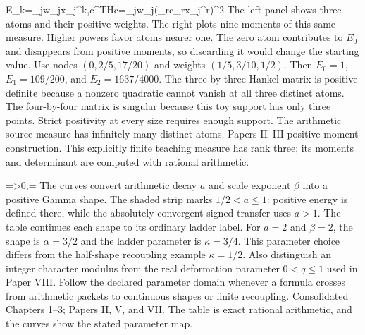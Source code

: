 {E_k=\sum_jw_jx_j^k,\qquad c^THc=\sum_jw_j\left(\sum_rc_rx_j^r\right)^2}
{The left panel shows three atoms and their positive weights. The right plots nine moments of this same measure. Higher powers favor atoms nearer one. The zero atom contributes to $E_0$ and disappears from positive moments, so discarding it would change the starting value.}
{Use nodes $(0,2/5,17/20)$ and weights $(1/5,3/10,1/2)$. Then $E_0=1$, $E_1=109/200$, and $E_2=1637/4000$. The three-by-three Hankel matrix is positive definite because a nonzero quadratic cannot vanish at all three distinct atoms. The four-by-four matrix is singular because this toy support has only three points.}
{Strict positivity at every size requires enough support. The arithmetic source measure has infinitely many distinct atoms.}
{Papers II--III positive-moment construction. This explicitly finite teaching measure has rank three; its moments and determinant are computed with rational arithmetic.}

{\alpha=>0,\qquad \kappa=\frac{}}
{The curves convert arithmetic decay $a$ and scale exponent $\beta$ into a positive Gamma shape. The shaded strip marks $1/2<a\le1$: positive energy is defined there, while the absolutely convergent signed transfer uses $a>1$. The table continues each shape to its ordinary ladder label.}
{For $a=2$ and $\beta=2$, the shape is $\alpha=3/2$ and the ladder parameter is $\kappa=3/4$. This parameter choice differs from the half-shape recoupling example $\kappa=1/2$. Also distinguish an integer character modulus from the real deformation parameter $0<q\le1$ used in Paper VIII.}
{Follow the declared parameter domain whenever a formula crosses from arithmetic packets to continuous shapes or finite recoupling.}
{Consolidated Chapters 1--3; Papers II, V, and VII. The table is exact rational arithmetic, and the curves show the stated parameter map.}

